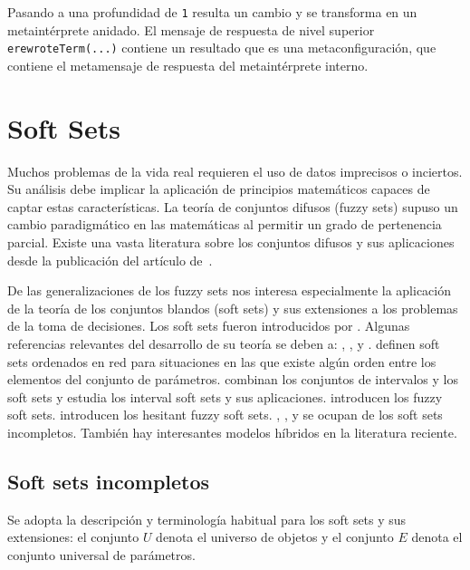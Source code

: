 Pasando a una profundidad de \texttt{1} resulta un cambio y se transforma en un metaintérprete anidado.
El mensaje de respuesta de nivel superior \texttt{erewroteTerm(...)} contiene un resultado que es una metaconfiguración, que contiene el metamensaje de respuesta del metaintérprete interno.



\newpage
\section{Soft Sets}\label{SS}
Muchos problemas de la vida real requieren el uso de datos imprecisos o inciertos. Su análisis debe implicar la aplicación de principios matemáticos capaces de captar estas características. La teoría de conjuntos difusos (fuzzy sets) supuso un cambio paradigmático en las matemáticas al permitir un grado de pertenencia parcial. Existe una vasta literatura sobre los conjuntos difusos y sus aplicaciones desde la publicación del artículo de~\citet{Zadeh}. 

De las generalizaciones de los fuzzy sets nos interesa especialmente la aplicación de la teoría de los conjuntos blandos (soft sets) y sus extensiones a los problemas de la toma de decisiones.
Los soft sets fueron introducidos por \citep{Molodtsov99}. 
Algunas referencias relevantes del desarrollo de su teoría se deben a: \citet{AktasCagman}, \citet{Alcantud2016IJAR}, \citet{AliFengLiuMinShabir} y \citet{MajiBR03}.
\citet{AliMahmood} definen soft sets ordenados en red para situaciones en las que existe algún orden entre los elementos del conjunto de parámetros. \citet{QinMengPeiXu} combinan los conjuntos de intervalos y los soft sets y \citet{Zhang} estudia los interval soft sets y sus aplicaciones. \citet{MajiBR01} introducen los fuzzy soft sets. \citet{WangLiChen} introducen los hesitant fuzzy soft sets. \citet{Hanetal}, \citet{QinMaHerawanZain}, y \citet{ZouXiao} se ocupan de los soft sets incompletos. También hay interesantes modelos híbridos en la literatura reciente.


\subsection{Soft sets incompletos}

Se adopta la descripción y terminología habitual para los soft sets y sus extensiones: el conjunto $U$ denota el universo de objetos y el conjunto $E$ denota el conjunto universal de parámetros.

